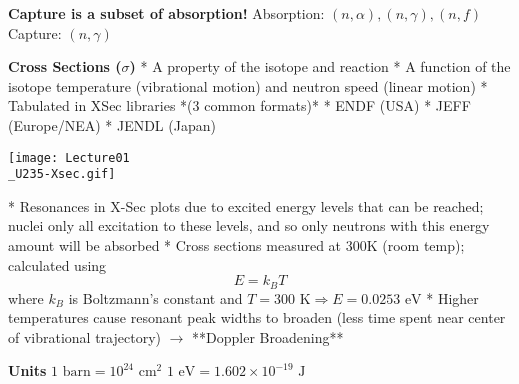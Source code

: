 \documentclass{report}
\begin{document}
	\textbf{Capture is a subset of absorption!}
	Absorption: $(n,\alpha), (n,\gamma), (n,f)$  
	Capture: $(n,\gamma)$
	
\textbf{Cross Sections ($\sigma$)}
* A property of the isotope and reaction
* A function of the isotope temperature (vibrational motion) and neutron speed (linear motion)
* Tabulated in XSec libraries *(3 common formats)*
	* ENDF (USA)
	* JEFF (Europe/NEA)
	* JENDL (Japan)

\texttt{[image: Lecture01\\\_U235-Xsec.gif]}

* Resonances in X-Sec plots due to excited energy levels that can be reached; nuclei only all excitation to these levels, and so only neutrons with this energy amount will be absorbed
* Cross sections measured at 300K (room temp); calculated using
	$$ E = k_BT $$ where $k_B$ is Boltzmann's constant and $T=300 \text{ K} \Rightarrow E = 0.0253 \text{ eV}$
* Higher temperatures cause resonant peak widths to broaden (less time spent near center of vibrational trajectory) $\rightarrow$ **Doppler Broadening**

\textbf{Units}
$1 \text{ barn} = 10^{24} \text{ cm}^2$  
$1 \text{ eV} = 1.602 \times 10^{-19} \text{ J}$
\end{document}
